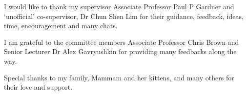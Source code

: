 \begin{acknowledgements}
I would like to thank my supervisor Associate Professor Paul P Gardner and `unofficial' co-supervisor, Dr Chun Shen Lim for their guidance, feedback, ideas, time, encouragement and many chats. 

I am grateful to the committee members Associate Professor Chris Brown and Senior Lecturer Dr Alex Gavryushkin for providing many feedbacks along the way. 


Special thanks to my family, Mammam and her kittens, and many others for their love and support.

\end{acknowledgements}